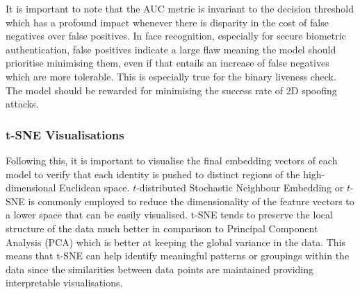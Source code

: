 \documentclass{mpaper}
\begin{document}
It is important to note that the AUC metric is invariant to the decision threshold which has a profound impact whenever there is disparity in the cost of false negatives over false positives. In face recognition, especially for secure biometric authentication, false positives indicate a large flaw meaning the model should prioritise minimising them, even if that entails an increase of false negatives which are more tolerable. This is especially true for the binary liveness check. The model should be rewarded for minimising the success rate of 2D spoofing attacks.

\begin{table}[htbp]
    \centering
    \vspace{0.1cm}
    \caption{Table listing the macro-averaged AUC metrics for all fusion methods as well as the individual modalities.}
    \label{tab:macro_auc}
\end{table}


\subsubsection{t-SNE Visualisations}
Following this, it is important to visualise the final embedding vectors of each model to verify that each identity is pushed to distinct regions of the high-dimensional Euclidean space. $t$-distributed Stochastic Neighbour Embedding or $t$-SNE \cite{van2008visualizing} is commonly employed to reduce the dimensionality of the feature vectors to a lower space that can be easily visualised. t-SNE tends to preserve the local structure of the data much better in comparison to Principal Component Analysis (PCA) which is better at keeping the global variance in the data. This means that t-SNE can help identify meaningful patterns or groupings within the data since the similarities between data points are maintained providing interpretable visualisations.
\end{document}

